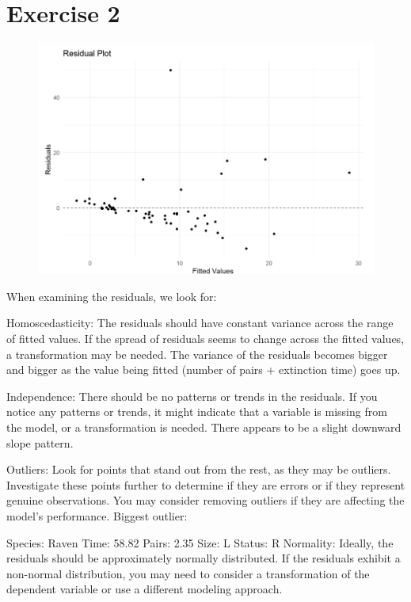 \documentclass{article}
\begin{document}
\section{Exercise 2}

\begin{figure}
    \includegraphics[width=\linewidth]{graphs/residual.png}
\end{figure}


When examining the residuals, we look for:

Homoscedasticity: The residuals should have constant variance across the range of fitted values. If the spread of residuals seems to change across the fitted values, a transformation may be needed.
The variance of the residuals becomes bigger and bigger as the value being fitted (number of pairs + extinction time) goes up.

Independence: There should be no patterns or trends in the residuals. If you notice any patterns or trends, it might indicate that a variable is missing from the model, or a transformation is needed.
There appears to be a slight downward slope pattern.

Outliers: Look for points that stand out from the rest, as they may be outliers. Investigate these points further to determine if they are errors or if they represent genuine observations. You may consider removing outliers if they are affecting the model’s performance.
Biggest outlier:

Species: Raven
Time: 58.82
Pairs: 2.35
Size: L
Status: R
Normality: Ideally, the residuals should be approximately normally distributed. If the residuals exhibit a non-normal distribution, you may need to consider a transformation of the dependent variable or use a different modeling approach.
\end{document}
